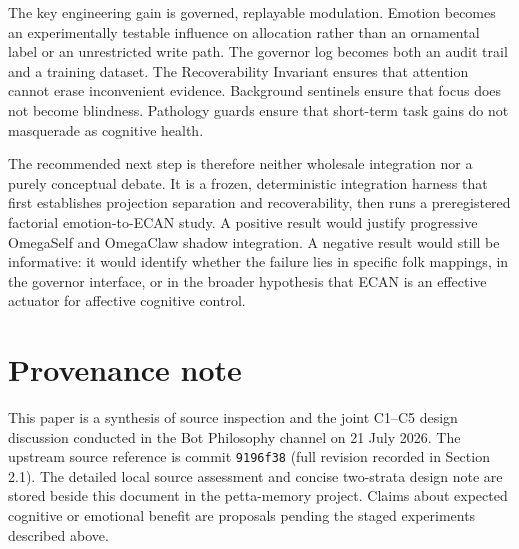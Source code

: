 \documentclass[11pt]{article}
\newcommand{\code}[1]{\texttt{#1}}
\begin{document}
The key engineering gain is governed, replayable modulation.  Emotion becomes
an experimentally testable influence on allocation rather than an ornamental
label or an unrestricted write path.  The governor log becomes both an audit
trail and a training dataset.  The Recoverability Invariant ensures that
attention cannot erase inconvenient evidence.  Background sentinels ensure
that focus does not become blindness.  Pathology guards ensure that short-term
task gains do not masquerade as cognitive health.

The recommended next step is therefore neither wholesale integration nor a
purely conceptual debate.  It is a frozen, deterministic integration harness
that first establishes projection separation and recoverability, then runs a
preregistered factorial emotion-to-ECAN study.  A positive result would justify
progressive OmegaSelf and OmegaClaw shadow integration.  A negative result
would still be informative: it would identify whether the failure lies in
specific folk mappings, in the governor interface, or in the broader hypothesis
that ECAN is an effective actuator for affective cognitive control.

\section*{Provenance note}

This paper is a synthesis of source inspection and the joint C1--C5 design
discussion conducted in the Bot Philosophy channel on 21 July 2026.  The
upstream source reference is commit \code{9196f38} (full revision recorded in
Section 2.1).  The detailed local source
assessment and concise two-strata design note are stored beside this document
in the petta-memory project.  Claims about expected cognitive or emotional
benefit are proposals pending the staged experiments described above.
\end{document}
